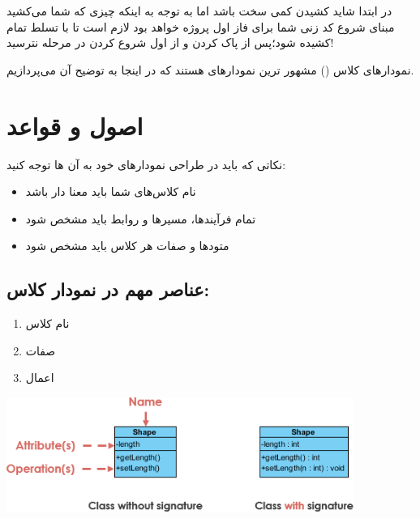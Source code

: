 \documentclass[]{article}
\begin{document}
در ابتدا شاید کشیدن  کمی سخت باشد اما به توجه به اینکه چیزی که شما می‌کشید مبنای شروع کد زنی شما برای فاز اول پروژه خواهد بود لازم است تا با تسلط تمام کشیده شود؛پس از پاک کردن و از اول شروع کردن در مرحله  نترسید! 

نمودارهای کلاس () مشهور ترین نمودارهای  هستند که در اینجا به توضیح آن می‌پردازیم.

\newpage

\section*{{\titr اصول و قواعد }}

نکاتی که باید در طراحی نمودارهای خود به آن ها توجه کنید:

\begin{itemize}

\item
نام کلاس‌های شما باید معنا دار باشد

\item
تمام فرآیندها، مسیرها و روابط باید مشخص شود

\item
متودها و صفات هر کلاس باید مشخص شود



\end{itemize}


\subsection*{{\titr عناصر مهم در نمودار کلاس:}}

\begin{enumerate}

\item

نام کلاس

\item
صفات

\item
اعمال

\end{enumerate}


\begin{center}

\includegraphics[width=0.85\textwidth]{images/image11.png}

\end{center}
\end{document}

